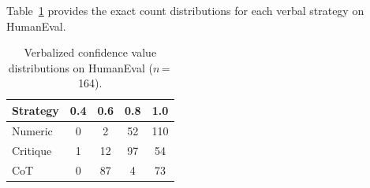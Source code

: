 \documentclass{article}
\begin{document}
Table~\ref{tab:verbal_detail} provides the exact count distributions for each verbal strategy on HumanEval.

\begin{table}[h]
\centering
\caption{Verbalized confidence value distributions on HumanEval ($n$\,=\,164).}
\label{tab:verbal_detail}
\small
\begin{tabular}{@{}lcccc@{}}
\toprule
\textbf{Strategy} & \textbf{0.4} & \textbf{0.6} & \textbf{0.8} & \textbf{1.0} \\
\midrule
Numeric & 0 & 2 & 52 & 110 \\
Critique & 1 & 12 & 97 & 54 \\
CoT & 0 & 87 & 4 & 73 \\
\bottomrule
\end{tabular}
\end{table}
\end{document}
